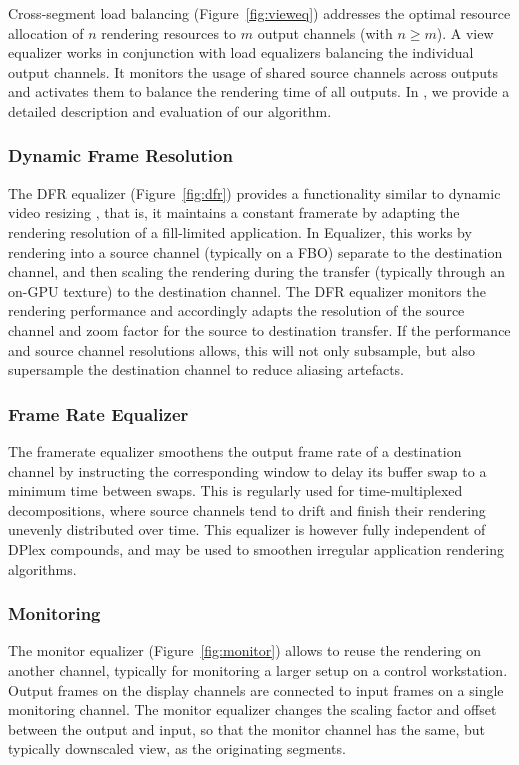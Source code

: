 \documentclass[10pt,journal,compsoc]{IEEEtran}
\newcommand{\fig}[1]{Figure~\ref{#1}}
\begin{document}
Cross-segment load balancing (\fig{fig:vieweq}) addresses the optimal resource
allocation of $n$ rendering resources to $m$ output channels (with $n\geq m$). A
view equalizer works in conjunction with load equalizers balancing the
individual output channels. It monitors the usage of shared source channels
across outputs and activates them to balance the rendering time of all outputs.
In \cite{EEP:11}, we provide a detailed description and evaluation of our
algorithm.

\subsubsection{Dynamic Frame Resolution}

The DFR equalizer (\fig{fig:dfr}) provides a functionality similar to dynamic
video resizing \cite{MBDM:97}, that is, it maintains a constant framerate by
adapting the rendering resolution of a fill-limited application. In
\textsf{Equalizer}, this works by rendering into a source channel (typically on
a FBO) separate to the destination channel, and then scaling the rendering
during the transfer (typically through an on-GPU texture) to the destination
channel. The DFR equalizer monitors the rendering performance and accordingly
adapts the resolution of the source channel and zoom factor for the source to
destination transfer. If the performance and source channel resolutions allows,
this will not only subsample, but also supersample the destination channel to
reduce aliasing artefacts.

\subsubsection{Frame Rate Equalizer}\label{sec:framerateEq}

The framerate equalizer smoothens the output frame rate of a destination channel
by instructing the corresponding window to delay its buffer swap to a minimum
time between swaps. This is regularly used for time-multiplexed decompositions,
where source channels tend to drift and finish their rendering unevenly
distributed over time. This equalizer is however fully independent of DPlex
compounds, and may be used to smoothen irregular application rendering
algorithms.

\subsubsection{Monitoring}

The monitor equalizer (\fig{fig:monitor}) allows to reuse the rendering on
another channel, typically for monitoring a larger setup on a control
workstation. Output frames on the display channels are connected to input frames
on a single monitoring channel. The monitor equalizer changes the scaling factor
and offset between the output and input, so that the monitor channel has the
same, but typically downscaled view, as the originating segments.
\end{document}
